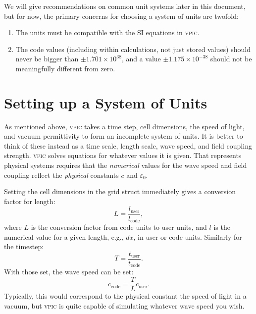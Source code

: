 \documentclass[twocolumn,10pt]{article}
\begin{document}
We will give recommendations on common unit systems later in this document, but for now, the primary concerns for choosing a system of units are twofold:
\begin{enumerate}
    \item The units must be compatible with the SI equations in \textsc{vpic}.
    \item The code values (including within calculations, not just stored values) should never be bigger than $\pm1.701\times 10^{38}$, and a value $\pm1.175\times 10^{-38}$ should not be meaningfully different from zero.
\end{enumerate}


	\section{Setting up a System of Units}

    As mentioned above, \textsc{vpic} takes a time step, cell dimensions, the speed of light, and vacuum permittivity to form an incomplete system of units.
    It is better to think of these instead as a time scale, length scale, wave speed, and field coupling strength.
    \textsc{vpic} solves equations for whatever values it is given.
    That  represents physical systems requires that the \emph{numerical} values for the wave speed and field coupling reflect the \emph{physical} constants $c$ and $\varepsilon_0$.

    Setting the cell dimensions in the grid struct immediately gives a conversion factor for length:
    \begin{equation}
        L = \frac{l_{\textrm{user}}}{l_{\textrm{code}}},
    \end{equation}
    where $L$ is the conversion factor from code units to user units, and $l$ is the numerical value for a given length, e.g., $dx$, in user or code units.
    Similarly for the timestep:
    \begin{equation}
        T = \frac{t_\textrm{user}}{t_\textrm{code}}.
    \end{equation}
    With those set, the wave speed can be set:
    \begin{equation}
        c_\textrm{code} = \frac{T}{L}c_\textrm{user}.
    \end{equation}
    Typically, this would correspond to the physical constant the speed of light in a vacuum, but \textsc{vpic} is quite capable of simulating whatever wave speed you wish.
\end{document}
